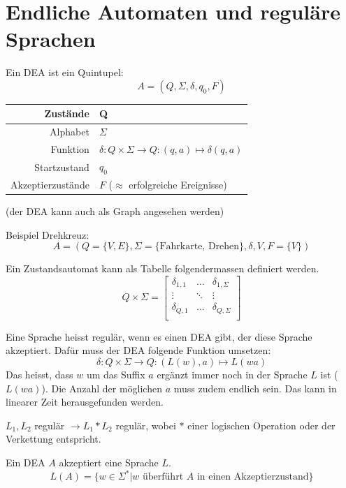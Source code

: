 \documentclass[a4paper]{article}
\begin{document}
\section{Endliche Automaten und reguläre Sprachen}
	\begin{multicols}{2}

	\begin{fdef}
		Ein DEA ist ein Quintupel: 
		$$A = (Q, \Sigma , \delta , q_0, F)$$
		\begin{tabular}{r|l}
		Zustände & Q \\\hline
		Alphabet & $\Sigma$ \\\hline
		Funktion & $\delta: Q \times \Sigma \rightarrow Q: (q,a) \mapsto \delta(q,a)$ \\\hline
		Startzustand & $q_0$ \\\hline
		Akzeptierzustände & $F$ ($\approx$ erfolgreiche Ereignisse)
		\end{tabular}
		(der DEA kann auch als Graph angesehen werden)
	\end{fdef}

	Beispiel Drehkreuz:
	$$A = (Q = \{V,E\}, \Sigma = \{\text{Fahrkarte, Drehen}\}, \delta, V, F = \{V\})$$
	
	\begin{fdef}[Tabellenform]
	Ein Zustandsautomat kann als Tabelle folgendermassen definiert werden. 
	$$Q \times \Sigma = \left[ \begin{array}{cccc}
                          \delta_{1,1} & \dots & \delta_{1,\Sigma} \\
                          \vdots & \ddots & \vdots\\
                          \delta_{Q,1} & \dots & \delta_{Q,\Sigma} \\
                        \end{array} \right]$$
	\end{fdef}
	
	\begin{fsatz}
	Eine Sprache heisst regulär, wenn es einen DEA gibt, der diese Sprache akzeptiert.
	Dafür muss der DEA folgende Funktion umsetzen: 
	$$\delta: Q\times \Sigma \rightarrow Q:(L(w), a) \mapsto L(wa)$$
	Das heisst, dass $w$ um das Suffix $a$ ergänzt immer noch in der Sprache $L$ ist ($L(wa)$). Die Anzahl der möglichen $a$ muss zudem endlich sein. Das kann in linearer Zeit herausgefunden werden.
	\end{fsatz}

	\begin{fsatz} \label{reglangop}
	$L_1, L_2$ regulär $\rightarrow L_1 * L_2$ regulär, wobei $*$ einer logischen Operation oder der Verkettung entspricht.
	\end{fsatz}

	\begin{fmerke}
	Ein DEA $A$ akzeptiert eine Sprache $L$.
	$$L(A) = \{ w \in \Sigma^* | w \text{ überführt } A \text{ in einen Akzeptierzustand} \}$$
	\end{fmerke}

	\end{multicols}	
	
\end{document}
